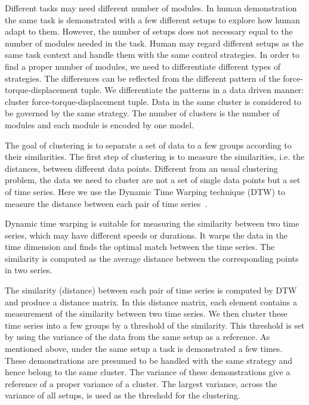 Different tasks may need different number of modules. In human demonstration the same task is demonstrated with a few different setups to explore how human adapt to them. However, the number of setups does not necessary equal to the number of modules needed in the task. Human may regard different setups as the same task context and handle them with the same control strategies. %
In order to find a proper number of modules, we need to differentiate different types of strategies. The differences can be reflected from the different pattern of the force-torque-displacement tuple. We differentiate the patterns in a data driven manner: cluster force-torque-displacement tuple. Data in the same cluster is considered to be governed by the same strategy. The number of clusters is the number of modules and each module is encoded by one model.


The goal of clustering is to separate a set of data to a few groups according to their similarities. The first step of clustering is to measure the similarities, i.e. the distances, between different data points. Different from an usual clustering problem, the data we need to cluster are not a set of single data points but a set of time series. Here we use the Dynamic Time Warping technique (DTW) to measure the distance between each pair of time series~\citep{berndt1994using}.

Dynamic time warping is suitable for measuring the similarity between two time series, which may have different speeds or durations. It warps the data in the time dimension and finds the optimal match between the time series. The similarity is computed as the average distance between the corresponding points in two series.

The similarity (distance) between each pair of time series is computed by DTW and produce a distance matrix. In this distance matrix, each element contains a measurement of the similarity between two time series. We then cluster these time series into a few groups by a threshold of the similarity. This threshold is set by using the variance of the data from the same setup as a reference. As mentioned above, under the same setup a task is demonstrated a few times. These demonstrations are presumed to be handled with the same strategy and hence belong to the same cluster. The variance of these demonstrations give a reference of a proper variance of a cluster. The largest variance, across the variance of all setups, is used as the threshold for the clustering.

